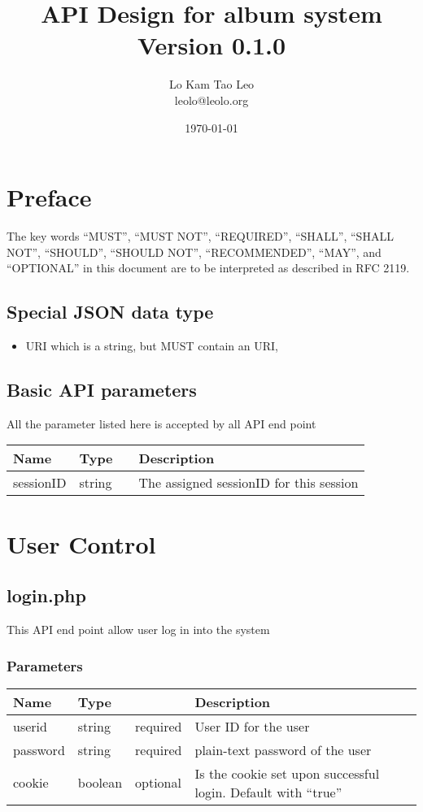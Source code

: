 \documentclass[a4paper,12pt]{report}
\title{API Design for album system Version 0.1.0}
\author{Lo Kam Tao Leo\\leolo@leolo.org}
\date{\today}
\begin{document}
	\maketitle
	\tableofcontents
	\chapter{Preface}
	The key words ``MUST'', ``MUST NOT'', ``REQUIRED'', ``SHALL'', ``SHALL
	NOT'', ``SHOULD'', ``SHOULD NOT'', ``RECOMMENDED'',  ``MAY'', and
	``OPTIONAL'' in this document are to be interpreted as described in
	RFC 2119.
	
	\section{Special JSON data type}
	\begin{itemize}
		\item \label{type:URI}URI which is a string, but MUST contain an URI, 
	\end{itemize}
	\section{Basic API parameters}
	All the parameter listed here is accepted by all API end point
	
	\begin{tabular}{|l|ll|p{10cm}|}
		\hline
		Name & Type & & Description\\\hline
		sessionID & string &  & The assigned sessionID for this session\\\hline
	\end{tabular}
	\chapter{User Control}
	\section{login.php}
	This API end point allow user log in into the system
	\subsection{Parameters}
	\begin{tabular}{|l|ll|p{10cm}|}
		\hline
		Name & Type & & Description\\\hline
		userid & string & required & User ID for the user\\\hline
		password & string & required & plain-text password of the user\\\hline
		cookie & boolean & optional & 	Is the cookie set upon successful login.\newline
										Default with ``true''\\\hline
	\end{tabular}
\end{document}
